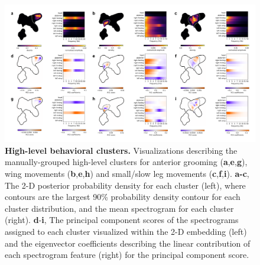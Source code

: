 \begin{figure}[!htb]
\includegraphics[width=1.0\textwidth]{Graving_IMPRS_Thesis/figures/cluster_appendix.pdf}

\caption{  \textbf{High-level behavioral clusters.} Visualizations describing the manually-grouped high-level clusters for anterior grooming (\textbf{a},\textbf{e},\textbf{g}), wing movements (\textbf{b},\textbf{e},\textbf{h}) and small/slow leg movements (\textbf{c},\textbf{f},\textbf{i}). \textbf{a-c}, The 2-D posterior probability density for each cluster (left), where contours are the largest 90\% probability density contour for each cluster distribution, and the mean spectrogram for each cluster (right). \textbf{d}-\textbf{i}, The principal component scores of the spectrograms assigned to each cluster visualized within the 2-D embedding (left) and the eigenvector coefficients describing the linear contribution of each spectrogram feature (right) for the principal component score.}

\label{fig:cluster_appendix_figure}

\end{figure}

